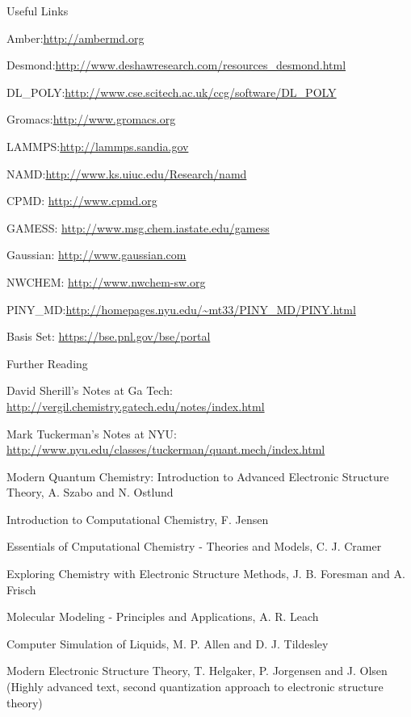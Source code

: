 \documentclass[slidestop,mathserif,compress,xcolor=svgnames]{beamer}
\begin{document}
\begin{frame}[allowframebreaks]
\begin{block}{Useful Links}
\begin{itemize}
{\footnotesize\color{Blue}
\item{\color{tigerspurple}Amber:}\url{http://ambermd.org}
\item{\color{tigerspurple}Desmond:}\url{http://www.deshawresearch.com/resources_desmond.html}
\item{\color{tigerspurple}DL\_POLY:}\url{http://www.cse.scitech.ac.uk/ccg/software/DL_POLY}
\item{\color{tigerspurple}Gromacs:}\url{http://www.gromacs.org}
\item{\color{tigerspurple}LAMMPS:}\url{http://lammps.sandia.gov}
\item{\color{tigerspurple}NAMD:}\url{http://www.ks.uiuc.edu/Research/namd}
\item {\color{tigerspurple}CPMD:} \url{http://www.cpmd.org}
\item {\color{tigerspurple}GAMESS:} \url{http://www.msg.chem.iastate.edu/gamess}
\item {\color{tigerspurple}Gaussian:} \url{http://www.gaussian.com}
\item {\color{tigerspurple}NWCHEM:} \url{http://www.nwchem-sw.org}
\item{\color{tigerspurple}PINY\_MD:}\url{http://homepages.nyu.edu/~mt33/PINY_MD/PINY.html}
\item {\color{tigerspurple}Basis Set:} \url{https://bse.pnl.gov/bse/portal}
}
\end{itemize}
\end{block}
\begin{block}{Further Reading}
\begin{itemize}
{\footnotesize
\item David Sherill's Notes at Ga Tech: {\color{Blue}\url{http://vergil.chemistry.gatech.edu/notes/index.html}}
\item Mark Tuckerman's Notes at NYU: {\color{Blue}\url{http://www.nyu.edu/classes/tuckerman/quant.mech/index.html}}
\item Modern Quantum Chemistry: Introduction to Advanced Electronic Structure Theory, A. Szabo and N. Ostlund
\item Introduction to Computational Chemistry, F. Jensen
\item Essentials of Cmputational Chemistry - Theories and Models, C. J. Cramer
\item Exploring Chemistry with Electronic Structure Methods, J. B. Foresman and A. Frisch
\item Molecular Modeling - Principles and Applications, A. R. Leach
\item Computer Simulation of Liquids, M. P. Allen and D. J. Tildesley
\item[$\vardiamond$]Modern Electronic Structure Theory, T. Helgaker, P. Jorgensen and J. Olsen (Highly advanced text, second quantization approach to electronic structure theory)
}
\end{itemize}
\end{block}
\end{frame}
\end{document}

